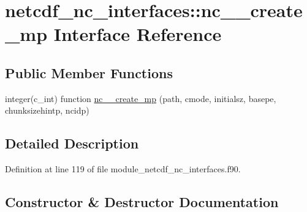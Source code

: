 \hypertarget{interfacenetcdf__nc__interfaces_1_1nc____create__mp}{}\section{netcdf\+\_\+nc\+\_\+interfaces\+:\+:nc\+\_\+\+\_\+create\+\_\+mp Interface Reference}
\label{interfacenetcdf__nc__interfaces_1_1nc____create__mp}
\subsection*{Public Member Functions}
\begin{DoxyCompactItemize}
\item 
integer(c\+\_\+int) function \hyperlink{interfacenetcdf__nc__interfaces_1_1nc____create__mp_a560c4548ed68b66d8de534afb84dbbfa}{nc\+\_\+\+\_\+create\+\_\+mp} (path, cmode, initialsz, basepe, chunksizehintp, ncidp)
\end{DoxyCompactItemize}


\subsection{Detailed Description}


Definition at line 119 of file module\+\_\+netcdf\+\_\+nc\+\_\+interfaces.\+f90.



\subsection{Constructor \& Destructor Documentation}
\mbox{\label{interfacenetcdf__nc__interfaces_1_1nc____create__mp_a560c4548ed68b66d8de534afb84dbbfa}} 
